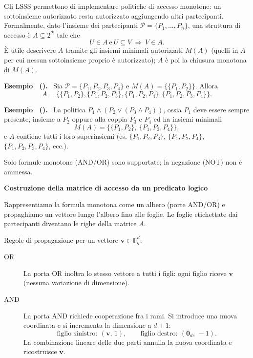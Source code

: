 \documentclass[a4paper, 11pt]{article}
\newenvironment{example}[1][]{
  \par\noindent\textbf{Esempio%
  \if\relax\detokenize{#1}\relax\else\ (\textbf{#1})\fi.}\ }{}
\begin{document}
Gli LSSS permettono di implementare politiche di accesso monotone: un sottoinsieme autorizzato resta autorizzato aggiungendo altri partecipanti. Formalmente, dato l'insieme dei partecipanti $\mathcal{P}=\{P_1,\dots,P_n\}$, una struttura di accesso è $A\subseteq 2^{\mathcal{P}}$ tale che
\[
U\in A \ \text{e}\ U\subseteq V \ \Rightarrow\ V\in A.
\]
È utile descrivere $A$ tramite gli insiemi minimali autorizzati $M(A)$ (quelli in $A$ per cui nessun sottoinsieme proprio è autorizzato); $A$ è poi la chiusura monotona di $M(A)$.

\begin{example}
Sia $\mathcal{P}=\{P_1,P_2,P_3,P_4\}$ e $M(A)=\{\{P_1,P_2\}\}$. Allora
\[
A=\{\{P_1,P_2\},\{P_1,P_2,P_3\},\{P_1,P_2,P_4\},\{P_1,P_2,P_3,P_4\}\}.
\]
\end{example}

\begin{example}
La politica $P_1 \land (P_2 \lor (P_3 \land P_4))$, ossia $P_1$ deve essere sempre presente, insieme a $P_2$ oppure alla coppia $P_3$ e $P_4$ ed ha insiemi minimali
\[
M(A)=\big\{\{P_1,P_2\},\ \{P_1,P_3,P_4\}\big\},
\]
e $A$ contiene tutti i loro superinsiemi (es. $\{P_1,P_2,P_3\}$, $\{P_1,P_2,P_4\}$, $\{P_1,P_2,P_3,P_4\}$, ecc.).
\end{example}

Solo formule monotone (AND/OR) sono supportate; la negazione (NOT) non è ammessa.

\textbf{Costruzione della matrice di accesso da un predicato logico}

Rappresentiamo la formula monotona come un albero (porte AND/OR) e propaghiamo un vettore lungo l'albero fino alle foglie. Le foglie etichettate dai partecipanti diventano le righe della matrice $A$.

Regole di propagazione per un vettore $\mathbf{v}\in\mathbb{F}_q^{d}$:
\begin{description}
    \item[OR] La porta OR inoltra lo stesso vettore a tutti i figli: ogni figlio riceve $\mathbf{v}$ (nessuna variazione di dimensione).
    \item[AND] La porta AND richiede cooperazione fra i rami. Si introduce una nuova coordinata e si incrementa la dimensione a $d{+}1$:
    \[
    \text{figlio sinistro}:\ (\mathbf{v},\,1),\qquad
    \text{figlio destro}:\ (\mathbf{0}_d,\,-1).
    \]
    La combinazione lineare delle due parti annulla la nuova coordinata e ricostruisce $\mathbf{v}$.
\end{description}
\end{document}
